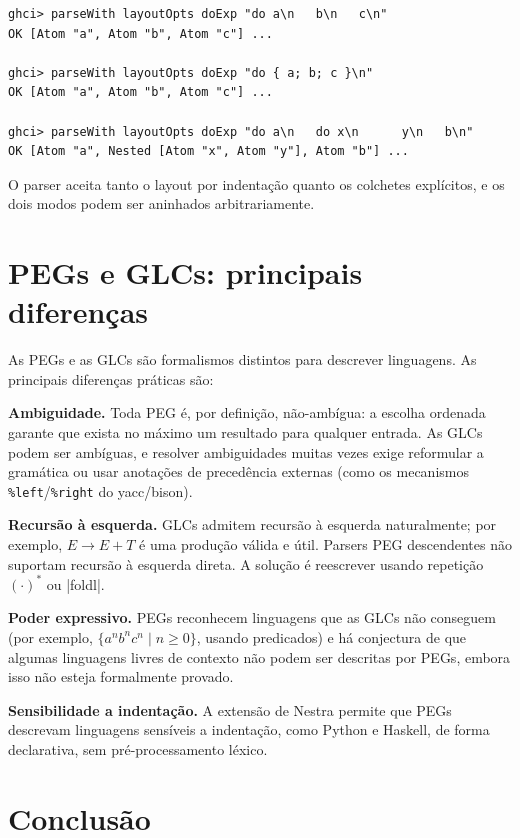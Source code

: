 \begin{verbatim}
ghci> parseWith layoutOpts doExp "do a\n   b\n   c\n"
OK [Atom "a", Atom "b", Atom "c"] ...

ghci> parseWith layoutOpts doExp "do { a; b; c }\n"
OK [Atom "a", Atom "b", Atom "c"] ...

ghci> parseWith layoutOpts doExp "do a\n   do x\n      y\n   b\n"
OK [Atom "a", Nested [Atom "x", Atom "y"], Atom "b"] ...
\end{verbatim}

O parser aceita tanto o layout por indentação quanto os colchetes
explícitos, e os dois modos podem ser aninhados arbitrariamente.

\section{PEGs e GLCs: principais diferenças}

As PEGs e as GLCs são formalismos distintos para descrever
linguagens. As principais diferenças práticas são:

\textbf{Ambiguidade.} Toda PEG é, por definição, não-ambígua: a
escolha ordenada garante que exista no máximo um resultado para
qualquer entrada. As GLCs podem ser ambíguas, e resolver ambiguidades
muitas vezes exige reformular a gramática ou usar anotações de
precedência externas (como os mecanismos
  \verb|%left|/\verb|%right| do yacc/bison).

  \textbf{Recursão à esquerda.} GLCs admitem recursão à esquerda
  naturalmente; por exemplo, \(E \to E + T\) é uma produção válida e
  útil. Parsers PEG descendentes não suportam recursão à esquerda
  direta. A solução é reescrever usando repetição \((\cdot)^*\) ou
  \haskell|foldl|.

  \textbf{Poder expressivo.} PEGs reconhecem linguagens que as GLCs não
  conseguem (por exemplo, \(\{a^n b^n c^n \mid n \geq 0\}\), usando
  predicados) e há conjectura de que algumas linguagens livres de
  contexto não podem ser descritas por PEGs, embora isso não esteja
  formalmente provado.

  \textbf{Sensibilidade a indentação.} A extensão de Nestra permite
  que PEGs descrevam linguagens sensíveis a indentação, como Python e
  Haskell, de forma declarativa, sem pré-processamento léxico.

  \section{Conclusão}

